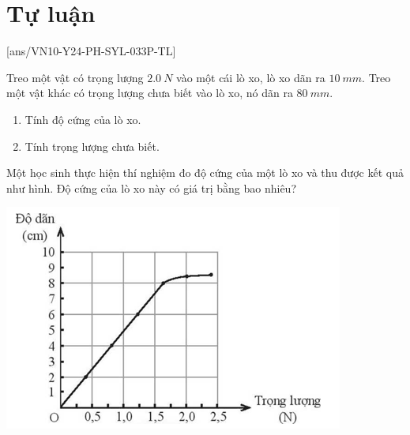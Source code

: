 \section{Tự luận}
\setcounter{ex}{0}
[ans/VN10-Y24-PH-SYL-033P-TL]
\begin{ex}
	Treo một vật có trọng lượng $\SI{2.0}{N}$ vào một cái lò xo, lò xo dãn ra $\SI{10}{mm}$. Treo một vật khác có trọng lượng chưa biết vào lò xo, nó dãn ra $\SI{80}{mm}$.
	\begin{enumerate}[label=\alph*)]
		\item Tính độ cứng của lò xo.
		\item Tính trọng lượng chưa biết.
	\end{enumerate}
\end{ex}
\begin{ex}
	Một học sinh thực hiện thí nghiệm đo độ cứng của một lò xo và thu được kết quả như hình. Độ cứng của lò xo này có giá trị bằng bao nhiêu?
	\begin{center}
		\includegraphics[width=0.4\linewidth]{../figs/VN10-2023-PH-TP033-4}
	\end{center}
\end{ex}
